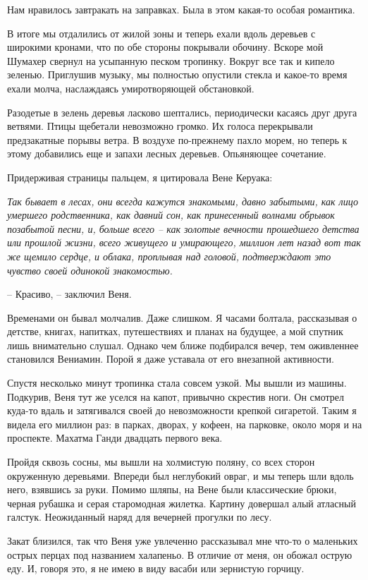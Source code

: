 \documentclass[
]{book}
\begin{document}
Нам нравилось завтракать на заправках. Была в этом какая-то особая романтика.

В итоге мы отдалились от жилой зоны и теперь ехали вдоль деревьев с широкими кронами, что по обе стороны покрывали обочину. Вскоре мой Шумахер свернул на усыпанную песком тропинку. Вокруг все так и кипело зеленью. Приглушив музыку, мы полностью опустили стекла и какое-то время ехали молча, наслаждаясь умиротворяющей обстановкой.

Разодетые в зелень деревья ласково шептались, периодически касаясь друг друга ветвями. Птицы щебетали невозможно громко. Их голоса перекрывали предзакатные порывы ветра. В воздухе по-прежнему пахло морем, но теперь к этому добавились еще и запахи лесных деревьев. Опьяняющее сочетание.

Придерживая страницы пальцем, я цитировала Вене Керуака:

\emph{Так бывает в лесах, они всегда кажутся знакомыми, давно забытыми, как лицо умершего родственника, как давний сон, как принесенный волнами обрывок позабытой песни, и, больше всего -- как золотые вечности прошедшего детства или прошлой жизни, всего живущего и умирающего, миллион лет назад вот так же щемило сердце, и облака, проплывая над головой, подтверждают это чувство своей одинокой знакомостью.}

-- Красиво, -- заключил Веня.

Временами он бывал молчалив. Даже слишком. Я часами болтала, рассказывая о детстве, книгах, напитках, путешествиях и планах на будущее, а мой спутник лишь внимательно слушал. Однако чем ближе подбирался вечер, тем оживленнее становился Вениамин. Порой я даже уставала от его внезапной активности.

Спустя несколько минут тропинка стала совсем узкой. Мы вышли из машины. Подкурив, Веня тут же уселся на капот, привычно скрестив ноги. Он смотрел куда-то вдаль и затягивался своей до невозможности крепкой сигаретой. Таким я видела его миллион раз: в парках, дворах, у кофеен, на парковке, около моря и на проспекте. Махатма Ганди двадцать первого века.

Пройдя сквозь сосны, мы вышли на холмистую поляну, со всех сторон окруженную деревьями. Впереди был неглубокий овраг, и мы теперь шли вдоль него, взявшись за руки. Помимо шляпы, на Вене были классические брюки, черная рубашка и серая старомодная жилетка. Картину довершал алый атласный галстук. Неожиданный наряд для вечерней прогулки по лесу.

Закат близился, так что Веня уже увлеченно рассказывал мне что-то о маленьких острых перцах под названием халапеньо. В отличие от меня, он обожал острую еду. И, говоря это, я не имею в виду васаби или зернистую горчицу.
\end{document}
